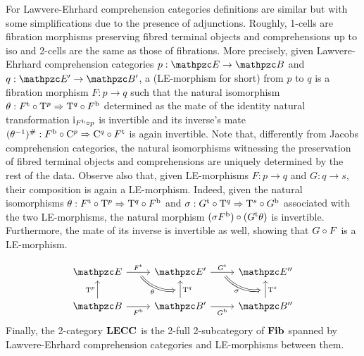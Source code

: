 \documentclass{lmcs} %
\theoremstyle{plain}\newtheorem{satz}[thm]{Satz} %
\begin{document}
For Lawvere-Ehrhard comprehension categories  definitions are similar but with some simplifications due to the presence of adjunctions. 
Roughly, 1-cells are fibration morphisms preserving fibred terminal objects and comprehensions up to iso and 2-cells are the same as those of fibrations. 
More precisely, 
given Lawvere-Ehrhard comprehension categories  $p:\ct{E}\rightarrow\ct{B}$ and $q:\ct{E'}\rightarrow\ct{B'}$, 
a  (LE-morphism for short) from $p$ to $q$ is a fibration morphism $F:p\to q$ such that the natural isomorphism $\theta:{F}^{\mathrm{t}}\circ \mathrm{T}^{p}\Rightarrow \mathrm{T}^{q}\circ {F}^{\mathrm{b}}$ determined as the mate of the identity natural transformation $\mathrm{i}_{{F}^{\mathrm{b}}\circ p}$ is invertible and its inverse's mate $(\theta^{-1})^{\#}:{F}^{\mathrm{b}}\circ \mathrm{C}^{p}\Rightarrow \mathrm{C}^{q}\circ {F}^{\mathrm{t}}$ is again invertible.
Note that, differently from Jacobs comprehension categories, the natural isomorphisms witnessing the preservation of fibred terminal objects and comprehensions are uniquely determined by the rest of the data. 
Observe also that, 
given LE-morphisms $F:p\to q$ and $G:q\to s$, their composition is again a LE-morphism. 
Indeed, 
given the natural isomorphisms $\theta:{F}^{\mathrm{t}}\circ \mathrm{T}^{p}\Rightarrow \mathrm{T}^{q}\circ {F}^{\mathrm{b}}$ and $\sigma:{G}^{\mathrm{t}}\circ \mathrm{T}^{q}\Rightarrow \mathrm{T}^{s}\circ {G}^{\mathrm{b}}$ associated with the two LE-morphisms, 
the natural morphism  $(\sigma{F}^{\mathrm{b}})\circ ({G}^{\mathrm{t}}\theta)$ is invertible. Furthermore, the mate of its inverse is invertible as well, showing that $G\circ F$ is a LE-morphism.
				
			\[\begin{tikzcd}
				{\ct{E}} & {\ct{E'}} & {\ct{E''}} \\
				{\ct{B}} & {\ct{B'}} & {\ct{B''}}
				\arrow[""{name=0, anchor=center, inner sep=0}, "{\ft{F}}", from=1-1, to=1-2]
				\arrow[""{name=1, anchor=center, inner sep=0}, "{\ft{G}}", from=1-2, to=1-3]
				\arrow["{\term{p}}", from=2-1, to=1-1]
				\arrow["{\fb{F}}"', from=2-1, to=2-2]
				\arrow[""{name=2, anchor=center, inner sep=0}, "{\term{q}}"', from=2-2, to=1-2]
				\arrow["{\fb{G}}"', from=2-2, to=2-3]
				\arrow[""{name=3, anchor=center, inner sep=0}, "{\term{s}}"', from=2-3, to=1-3]
				\arrow["\theta"', bend right, shorten <=4pt, shorten >=4pt, Rightarrow, from=0, to=2]
				\arrow["\sigma"', bend right, shorten <=4pt, shorten >=4pt, Rightarrow, from=1, to=3]
			\end{tikzcd}\]
			Finally, the 2-category $\mathbf{LECC}$ is the 2-full 2-subcategory of $\mathbf{Fib}$ spanned by Lawvere-Ehrhard comprehension categories and LE-morphisms between them. 
			
\end{document}

